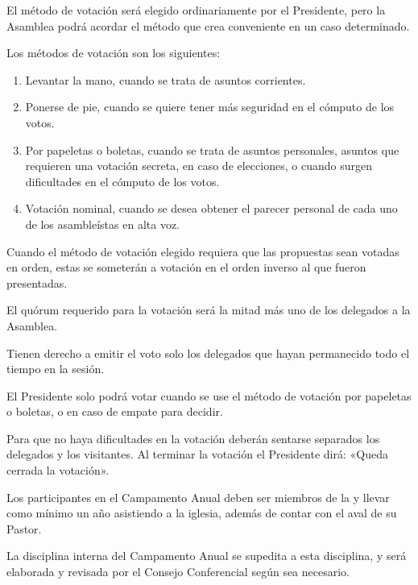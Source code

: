 
\article
El método de votación será elegido ordinariamente por el Presidente, pero la Asamblea podrá acordar el método que crea conveniente en un caso determinado.

\article
Los métodos de votación son los siguientes:
\begin{enumerate}[label=\alph*),noitemsep]
    \item Levantar la mano, cuando se trata de asuntos corrientes.
    \item Ponerse de pie, cuando se quiere tener más seguridad en el cómputo de los votos.
    \item Por papeletas o boletas, cuando se trata de asuntos personales, asuntos que requieren una votación secreta, en caso de elecciones, o cuando surgen dificultades en el cómputo de los votos.
    \item Votación nominal, cuando se desea obtener el parecer personal de cada uno de los asambleístas en alta voz.
\end{enumerate}
Cuando el método de votación elegido requiera que las propuestas sean votadas en orden, estas se someterán a votación en el orden inverso al que fueron presentadas.

\article
El quórum requerido para la votación será la mitad más uno de los delegados a la Asamblea.

\article
Tienen derecho a emitir el voto solo los delegados que hayan permanecido todo el tiempo en la sesión.

\article
El Presidente solo podrá votar cuando se use el método de votación por papeletas o boletas, o en caso de empate para decidir.

\article
Para que no haya dificultades en la votación deberán sentarse separados los delegados y los visitantes. Al terminar la votación el Presidente dirá: «Queda cerrada la votación».



\article
\label{participacion-campamento}
Los participantes en el Campamento Anual deben ser miembros de la \LMJ{} y llevar como mínimo un año asistiendo a la iglesia, además de contar con el aval de su Pastor.

\article
La disciplina interna del Campamento Anual se supedita a esta disciplina, y será elaborada y revisada por el Consejo Conferencial según sea necesario.

